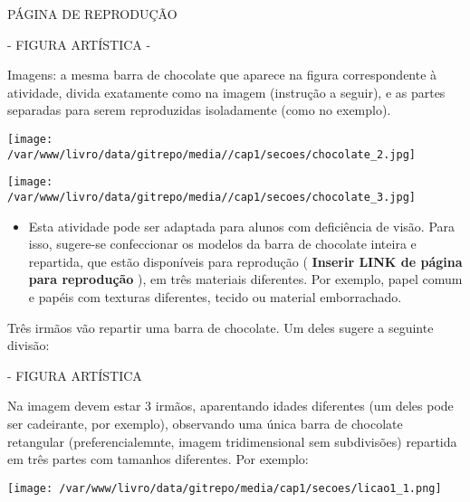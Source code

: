 \documentclass[a4paper,12pt,twoside]{book}
\begin{document}
\begin{professor*}[breakable]{}{}
  
  \begin{imagem*}[breakable]{}{}    
    PÁGINA DE REPRODUÇÃO    
    
    - FIGURA ARTÍSTICA -    
    
    Imagens: a mesma barra de chocolate que aparece na figura correspondente à atividade, divida exatamente como na imagem (instrução a seguir), e as partes separadas para serem reproduzidas isoladamente (como no exemplo).    
    
        \texttt{[image: /var/www/livro/data/gitrepo/media//cap1/secoes/chocolate\_2.jpg]}          
    
        \texttt{[image: /var/www/livro/data/gitrepo/media//cap1/secoes/chocolate\_3.jpg]}    
  \end{imagem*}  
  
\begin{itemize} %
    \item       Esta atividade pode ser adaptada para alunos com deficiência de visão. Para isso, sugere-se confeccionar os modelos da barra de chocolate  inteira e repartida, que estão disponíveis para reprodução (      {\bf Inserir LINK de página para reprodução}      ), em três materiais diferentes. Por exemplo, papel comum e papéis com texturas diferentes, tecido ou material emborrachado.  
\end{itemize} %
  
  
\end{professor*}


Três irmãos vão repartir uma barra de chocolate. Um deles sugere a seguinte divisão: 

\begin{imagem*}[breakable]{}{}   - FIGURA ARTÍSTICA   
  
  Na imagem devem estar 3 irmãos, aparentando idades diferentes (um deles pode ser cadeirante, por exemplo), observando uma única barra de chocolate retangular (preferencialemnte, imagem tridimensional sem subdivisões) repartida em três partes com tamanhos diferentes. Por exemplo:  
  
    \texttt{[image: /var/www/livro/data/gitrepo/media/cap1/secoes/licao1\_1.png]}  
  
\end{imagem*}
\end{document}
